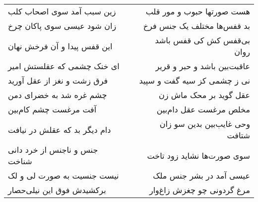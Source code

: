 \begin{center}
\begin{longtable}{l p{0.5cm} r}
\\
زین سبب آمد سوی اصحاب کلب
&&
هست صورتها حبوب و مور قلب
\\
زان شود عیسی سوی پاکان چرخ
&&
بد قفس‌ها مختلف یک جنس فرخ
\\
این قفس پیدا و آن فرخش نهان
&&
بی‌قفس کش کی قفس باشد روان
\\
ای خنک چشمی که عقلستش امیر
&&
عاقبت‌بین باشد و حبر و قریر
\\
فرق زشت و نغز از عقل آورید
&&
نی ز چشمی کز سیه گفت و سپید
\\
چشم غره شد به خضرای دمن
&&
عقل گوید بر محک ماش زن
\\
آفت مرغست چشم کام‌بین
&&
مخلص مرغست عقل دام‌بین
\\
دام دیگر بد که عقلش در نیافت
&&
وحی غایب‌بین بدین سو زان شتافت
\\
جنس و ناجنس از خرد دانی شناخت
&&
سوی صورت‌ها نشاید زود تاخت
\\
نیست جنسیت به صورت لی و لک
&&
عیسی آمد در بشر جنس ملک
\\
برکشیدش فوق این نیلی‌حصار
&&
مرغ گردونی چو چغزش زاغ‌وار
\\
\end{longtable}
\end{center}

